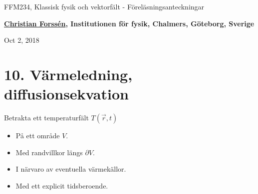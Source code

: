 \documentclass[%
oneside,                 %
final,                   %
10pt]{article}
\begin{document}

\newcommand{\exercisesection}[1]{\subsection*{#1}}







\thispagestyle{empty}

\begin{center}
{\LARGE\bf
\begin{spacing}{1.25}
FFM234, Klassisk fysik och vektorfält - Föreläsningsanteckningar
\end{spacing}
}
\end{center}


\begin{center}
{\bf \href{{http://fy.chalmers.se/subatom/tsp/}}{Christian Forssén}, Institutionen för fysik, Chalmers, Göteborg, Sverige${}^{}$} \\ [0mm]
\end{center}

\begin{center}
\end{center}
    

\begin{center}
Oct 2, 2018
\end{center}

\vspace{1cm}


\section*{10. Värmeledning, diffusionsekvation}

Betrakta ett temperaturfält $T(\vec{r},t)$
\begin{itemize}
\item På ett område $V$.

\item Med randvillkor längs $\partial V$.

\item I närvaro av eventuella värmekällor.

\item Med ett explicit tidsberoende.
\end{itemize}
\end{document}
